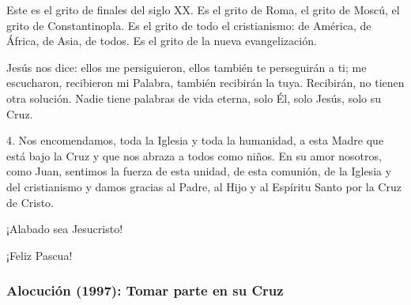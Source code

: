 \begin{body}
Este es el grito de finales del siglo XX. Es el grito de Roma, el grito de Moscú, el grito de Constantinopla. Es el grito de todo el cristianismo: de América, de África, de Asia, de todos. Es el grito de la nueva evangelización. 

Jesús nos dice: ellos me persiguieron, ellos también te perseguirán a ti; me escucharon, recibieron mi Palabra, también recibirán la tuya. Recibirán, no tienen otra solución. Nadie tiene palabras de vida eterna, solo Él, solo Jesús, solo su Cruz. 


4. Nos encomendamos, toda la Iglesia y toda la humanidad, a esta Madre que está bajo la Cruz y que nos abraza a todos como niños. En su amor nosotros, como Juan, sentimos la fuerza de esta unidad, de esta comunión, de la Iglesia y del cristianismo y damos gracias al Padre, al Hijo y al Espíritu Santo por la Cruz de Cristo. 

¡Alabado sea Jesucristo! 

¡Feliz Pascua!
\end{body}


\newpage 
\subsubsection{Alocución (1997): Tomar parte en su Cruz}


